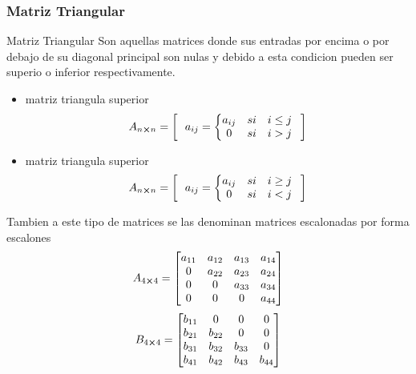 \subsubsection{Matriz Triangular}
\begin{Theorem*} {Matriz Triangular}
	Son aquellas matrices donde sus entradas por encima o por debajo de su diagonal principal son nulas y debido a esta condicion pueden ser superio o inferior respectivamente.
	\begin{itemize}
		\item matriz triangula superior
		$$A_{n\cross n}=\left[ \ \ a_{ij}=\left\{\begin{matrix}
			a_{ij} & si & i\le j \\
			0 & si & i>j
		\end{matrix}\right. \ \ \right]$$
		\item matriz triangula superior
		$$A_{n\cross n}=\left[ \ \ a_{ij}=\left\{\begin{matrix}
			a_{ij} & si & i\ge j \\
			0 & si & i<j
		\end{matrix}\right. \ \ \right]$$
	\end{itemize}
\end{Theorem*}
Tambien a este tipo de matrices se las denominan matrices escalonadas por forma escalones
$$
	A_{4\cross 4}=\begin{bmatrix}
		a_{11} & a_{12} & a_{13} & a_{14} \\
		0 & a_{22} & a_{23} &  a_{24} \\
		0 & 0 & a_{33} &  a_{34} \\
		0 & 0 & 0  & a_{44}
	\end{bmatrix}
$$
$$
B_{4\cross 4}=\begin{bmatrix}
	b_{11} & 0 & 0 & 0 \\
	b_{21} & b_{22} & 0 &  0 \\
	b_{31} & b_{32} & b_{33} &  0 \\
	b_{41} & b_{42} & b_{43}  & b_{44}
\end{bmatrix}
$$
